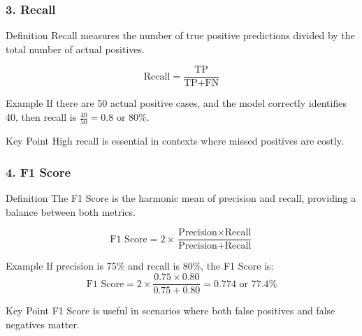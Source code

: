 \documentclass[aspectratio=169]{beamer}
\begin{document}
\begin{frame}[fragile]
    \frametitle{3. Recall}
    
    \begin{block}{Definition}
        Recall measures the number of true positive predictions divided by the total number of actual positives.
    \end{block}

    \begin{equation}
    \text{Recall} = \frac{\text{TP}}{\text{TP} + \text{FN}}
    \end{equation}
    
    \begin{block}{Example}
        If there are 50 actual positive cases, and the model correctly identifies 40, then recall is \( \frac{40}{50} = 0.8 \) or 80\%.
    \end{block}
    
    \begin{block}{Key Point}
        High recall is essential in contexts where missed positives are costly.
    \end{block}
\end{frame}

\begin{frame}[fragile]
    \frametitle{4. F1 Score}
    
    \begin{block}{Definition}
        The F1 Score is the harmonic mean of precision and recall, providing a balance between both metrics.
    \end{block}

    \begin{equation}
    \text{F1 Score} = 2 \times \frac{\text{Precision} \times \text{Recall}}{\text{Precision} + \text{Recall}}
    \end{equation}

    \begin{block}{Example}
        If precision is 75\% and recall is 80\%, the F1 Score is:
        \[
        \text{F1 Score} = 2 \times \frac{0.75 \times 0.80}{0.75 + 0.80} = 0.774 \text{ or } 77.4\%
        \]
    \end{block}
    
    \begin{block}{Key Point}
        F1 Score is useful in scenarios where both false positives and false negatives matter.
    \end{block}
\end{frame}
\end{document}
